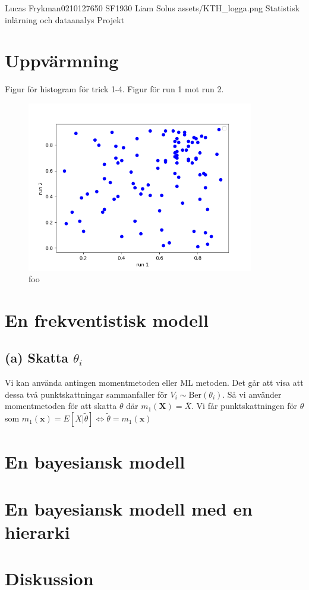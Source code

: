 \documentclass{assignment}
\begin{document}
\assignmentTitle
{Lucas Frykman}{0210127650}
{SF1930}
{Liam Solus}
{assets/KTH_logga.png}
{Statistisk inlärning och dataanalys}
{Projekt}


\section{Uppvärmning}
Figur för histogram för trick 1-4. Figur för run 1 mot run 2.
\begin{figure}[!h]
    \caption{foo}
    \begin{center}
        \includegraphics[width = 99mm]{assets/Figure_1.png}
    \end{center}
\end{figure}
\section{En frekventistisk modell}
\subsection*{(a) Skatta $\theta_{i}$}
Vi kan använda antingen momentmetoden eller ML metoden. Det går att visa att dessa två punktskattningar sammanfaller för $V_i \sim \text{Ber}(\theta_i)$.
Så vi använder momentmetoden för att skatta $\theta$ där
$m_1(\mathbf{X}) = \bar{X}$. Vi får punktskattningen för $\theta$ som
$m_1(\mathbf{x})= E[X|\tilde{\theta}] \Leftrightarrow \tilde{\theta} = m_1(\mathbf{x})$
\section{En bayesiansk modell}
\section{En bayesiansk modell med en hierarki}
\section{Diskussion}

%  
\end{document}
